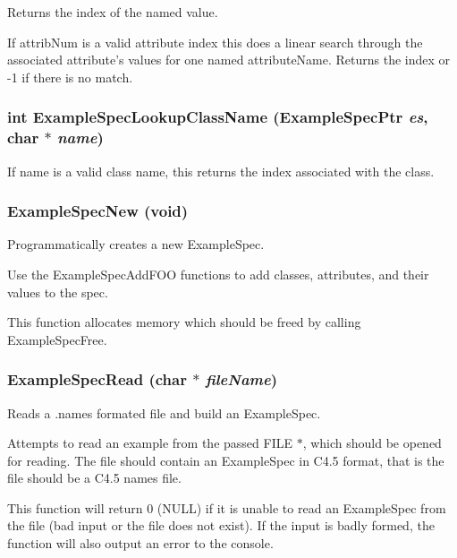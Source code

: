 Returns the index of the named value. 

If attrib\-Num is a valid attribute index this does a linear search through the associated attribute's values for one named attribute\-Name. Returns the index or -1 if there is no match. 
\subsubsection{\setlength{\rightskip}{0pt plus 5cm}int Example\-Spec\-Lookup\-Class\-Name ({\bf Example\-Spec\-Ptr} {\em es}, char $\ast$ {\em name})}\label{ExampleSpec_8h_a41}


If name is a valid class name, this returns the index associated with the class. 

\subsubsection{ Example\-Spec\-New (void)}\label{ExampleSpec_8h_a24}


Programmatically creates a new Example\-Spec. 

Use the Example\-Spec\-Add\-FOO functions to add classes, attributes, and their values to the spec.

This function allocates memory which should be freed by calling Example\-Spec\-Free. 
\subsubsection{ Example\-Spec\-Read (char $\ast$ {\em file\-Name})}\label{ExampleSpec_8h_a31}


Reads a .names formated file and build an Example\-Spec. 

Attempts to read an example from the passed FILE $\ast$, which should be opened for reading. The file should contain an Example\-Spec in C4.5 format, that is the file should be a C4.5 names file.

This function will return 0 (NULL) if it is unable to read an Example\-Spec from the file (bad input or the file does not exist). If the input is badly formed, the function will also output an error to the console.

